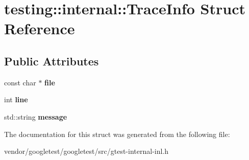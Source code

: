\hypertarget{structtesting_1_1internal_1_1_trace_info}{}\section{testing\+:\+:internal\+:\+:Trace\+Info Struct Reference}
\label{structtesting_1_1internal_1_1_trace_info}
\subsection*{Public Attributes}
\begin{DoxyCompactItemize}
\item 
\mbox{\label{structtesting_1_1internal_1_1_trace_info_a5d801209d3c0840aa55cfd4b67504254}} 
const char $\ast$ {\bfseries file}
\item 
\mbox{\label{structtesting_1_1internal_1_1_trace_info_ae9d269de1b77f4a3180d0d34acb4d7ff}} 
int {\bfseries line}
\item 
\mbox{\label{structtesting_1_1internal_1_1_trace_info_a39e74f39ce6d5fdbac799abdb1c27f90}} 
std\+::string {\bfseries message}
\end{DoxyCompactItemize}


The documentation for this struct was generated from the following file\+:\begin{DoxyCompactItemize}
\item 
vendor/googletest/googletest/src/gtest-\/internal-\/inl.\+h\end{DoxyCompactItemize}
